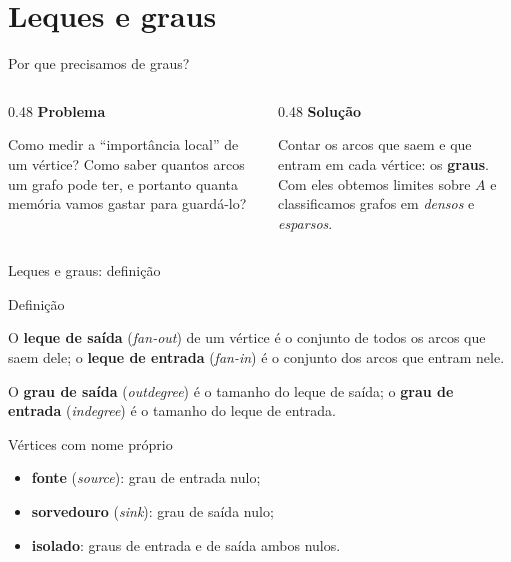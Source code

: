 \documentclass[aspectratio=169]{beamer}
\begin{document}
\section{Leques e graus}

\begin{frame}{Por que precisamos de graus?}
  \begin{columns}[T]
    \begin{column}{0.48\textwidth}
      \textbf{Problema}

      \medskip
      {\small Como medir a ``importância local'' de um vértice? Como saber
      quantos arcos um grafo pode ter, e portanto quanta memória vamos gastar
      para guardá-lo?}
    \end{column}
    \begin{column}{0.48\textwidth}
      \textbf{Solução}

      \medskip
      {\small Contar os arcos que saem e que entram em cada vértice: os
      \textbf{graus}. Com eles obtemos limites sobre $A$ e classificamos grafos
      em \emph{densos} e \emph{esparsos}.}
    \end{column}
  \end{columns}
\end{frame}

\begin{frame}{Leques e graus: definição}
  \begin{block}{Definição}
    {\small
    O \textbf{leque de saída} (\emph{fan-out}) de um vértice é o conjunto de
    todos os arcos que saem dele; o \textbf{leque de entrada} (\emph{fan-in}) é
    o conjunto dos arcos que entram nele.

    \smallskip
    O \textbf{grau de saída} (\emph{outdegree}) é o tamanho do leque de saída;
    o \textbf{grau de entrada} (\emph{indegree}) é o tamanho do leque de entrada.}
  \end{block}
  \begin{exampleblock}{Vértices com nome próprio}
    {\small
    \begin{itemize}\scriptsize
      \item \textbf{fonte} (\emph{source}): grau de entrada nulo;
      \item \textbf{sorvedouro} (\emph{sink}): grau de saída nulo;
      \item \textbf{isolado}: graus de entrada e de saída ambos nulos.
    \end{itemize}}
  \end{exampleblock}
\end{frame}
\end{document}
